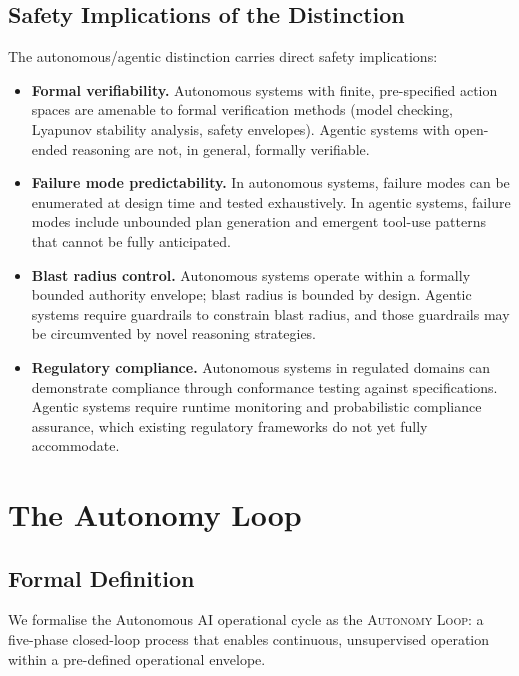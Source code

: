 \documentclass[12pt, a4paper]{article}
\begin{document}
\subsection{Safety Implications of the Distinction}

The autonomous/agentic distinction carries direct safety implications:

\begin{itemize}
    \item \textbf{Formal verifiability.} Autonomous systems with finite, pre-specified action spaces are amenable to formal verification methods (model checking, Lyapunov stability analysis, safety envelopes). Agentic systems with open-ended reasoning are not, in general, formally verifiable.
    \item \textbf{Failure mode predictability.} In autonomous systems, failure modes can be enumerated at design time and tested exhaustively. In agentic systems, failure modes include unbounded plan generation and emergent tool-use patterns that cannot be fully anticipated.
    \item \textbf{Blast radius control.} Autonomous systems operate within a formally bounded authority envelope; blast radius is bounded by design. Agentic systems require guardrails to constrain blast radius, and those guardrails may be circumvented by novel reasoning strategies.
    \item \textbf{Regulatory compliance.} Autonomous systems in regulated domains can demonstrate compliance through conformance testing against specifications. Agentic systems require runtime monitoring and probabilistic compliance assurance, which existing regulatory frameworks do not yet fully accommodate.
\end{itemize}

\section{The Autonomy Loop}\label{sec:loop}

\subsection{Formal Definition}

We formalise the Autonomous AI operational cycle as the \textsc{Autonomy Loop}: a five-phase closed-loop process that enables continuous, unsupervised operation within a pre-defined operational envelope.
\end{document}
